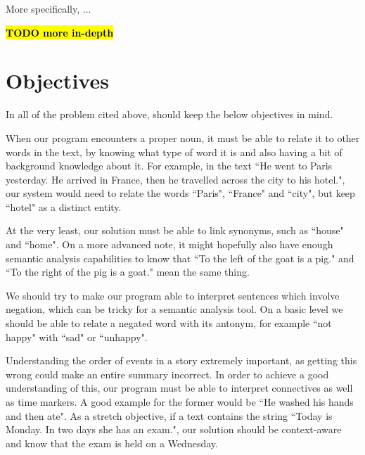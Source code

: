 More specifically, ...

\textcolor{red}{\textbf{\hl{TODO more in-depth}}}

\newpage

\section{Objectives}

In all of the problem cited above, should keep the below objectives in mind.

\begin{objective}
When our program encounters a proper noun, it must be able to relate it to other words in the text, by knowing what type of word it is and also having a bit of background knowledge about it. For example, in the text ``He went to Paris yesterday. He arrived in France, then he travelled across the city to his hotel.", our system would need to relate the words ``Paris", ``France" and ``city", but keep ``hotel" as a distinct entity.
\end{objective}

\begin{objective}[Periphrasis]
At the very least, our solution must be able to link synonyms, such as ``house" and ``home". On a more advanced note, it might hopefully also have enough semantic analysis capabilities to know that ``To the left of the goat is a pig." and ``To the right of the pig is a goat." mean the same thing.
\end{objective}

\begin{objective}[Negation]
We should try to make our program able to interpret sentences which involve negation, which can be tricky for a semantic analysis tool. On a basic level we should be able to relate a negated word with its antonym, for example ``not happy" with ``sad" or ``unhappy".
\end{objective}

\begin{objective}
Understanding the order of events in a story extremely important, as getting this wrong could make an entire summary incorrect. In order to achieve a good understanding of this, our program must be able to interpret connectives as well as time markers. A good example for the former would be ``He washed his hands and then ate". As a stretch objective, if a text contains the string ``Today is Monday. In two days she has an exam.", our solution should be context-aware and know that the exam is held on a Wednesday.
\end{objective}

